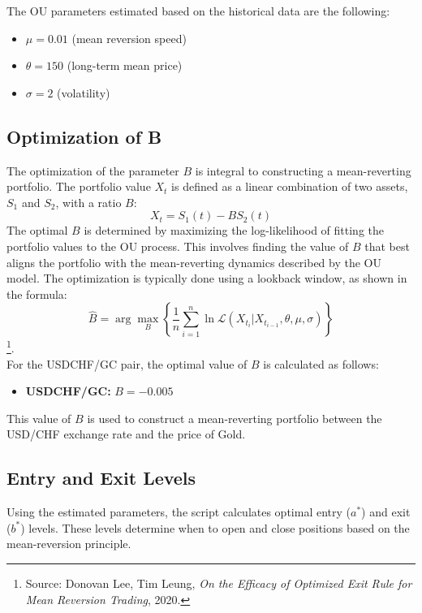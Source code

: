 \documentclass{article}
\begin{document}
The OU parameters estimated based on the historical data are the following:
\begin{itemize}
    \item $\mu = 0.01$ \quad (mean reversion speed)
    \item $\theta = 150$ \quad (long-term mean price)
    \item $\sigma = 2$ \quad (volatility)
\end{itemize}

\subsection*{Optimization of B}
The optimization of the parameter \( B \) is integral to constructing a mean-reverting portfolio. The portfolio value \( X_t \) is defined as a linear combination of two assets, \( S_1 \) and \( S_2 \), with a ratio \( B \):
\begin{equation}
X_t = S_1(t) - B S_2(t)
\end{equation}
The optimal \( B \) is determined by maximizing the log-likelihood of fitting the portfolio values to the OU process. This involves finding the value of \( B \) that best aligns the portfolio with the mean-reverting dynamics described by the OU model. The optimization is typically done using a lookback window, as shown in the formula:
\begin{equation}
\hat{B} = \arg \max_{B} \left\{ \frac{1}{n} \sum_{i=1}^{n} \ln \mathcal{L} \left( X_{t_i} | X_{t_{i-1}}, \theta, \mu, \sigma \right) \right\}
\end{equation} \footnote{Source: Donovan Lee, Tim Leung, \textit{On the Efficacy of Optimized Exit Rule for Mean Reversion Trading}, 2020.}.\\

For the USDCHF/GC pair, the optimal value of \( B \) is calculated as follows:
\begin{itemize}
    \item \textbf{USDCHF/GC:} \( B = -0.005 \)
\end{itemize}

This value of \( B \) is used to construct a mean-reverting portfolio between the USD/CHF exchange rate and the price of Gold.

\subsection*{Entry and Exit Levels}
Using the estimated parameters, the script calculates optimal entry ($a^*$) and exit ($b^*$) levels. These levels determine when to open and close positions based on the mean-reversion principle.
\end{document}
